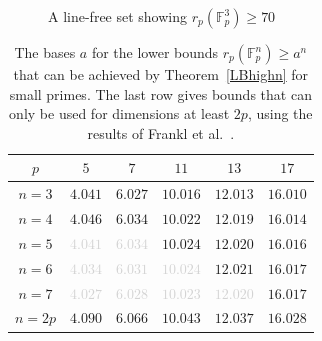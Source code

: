 \documentclass[12pt]{amsart}
\newcommand{\<}{\langle}
\renewcommand{\>}{\rangle}
\numberwithin{equation}{section}
\numberwithin{theorem}{section}
\begin{document}
\begin{figure}[H]
\caption{A line-free set showing $r_p(\mathbb{F}_p^3)\geq 70$}
\label{fig70}
\end{figure}

\begin{table}[h!]
\centering
\begin{tabular}{ |c|c|c|c|c|c| } 
\hline
$p$ & $5$ & $7$ & $11$ & $13$ & $17$ \\
\hline
$n=3$ & $4.041$ & $6.027$ & $10.016$ & $12.013$ & $16.010$ \\ 
$n=4$ & $4.046$ & $6.034$ & $10.022$ & $12.019$ & $16.014$ \\ 
$n=5$ & \textcolor{lightgray}{$4.041$} & \textcolor{lightgray}{$6.034$}  & $10.024$ & $12.020$ & $16.016$ \\ 
$n=6$ & \textcolor{lightgray}{$4.034$}  & \textcolor{lightgray}{$6.031$}  & \textcolor{lightgray}{$10.024$}   & $12.021$ & $16.017$ \\ 
$n=7$ & \textcolor{lightgray}{$4.027$}  & \textcolor{lightgray}{$6.028$}  & \textcolor{lightgray}{$10.023$}  & \textcolor{lightgray}{$12.020$}  & $16.017$ \\ 
\hline
$n=2p$ & $4.090$ & $6.066$ & $10.043$ & $12.037$ & $16.028$ \\ 
\hline

\end{tabular}
\caption{The bases $a$ for the lower bounds $r_p(\mathbb{F}_p^n)\geq a^n$ that can be achieved by Theorem~\ref{LBhighn} for small primes. The last row gives bounds that can only be used for dimensions at least $2p$, using the results of Frankl et al.~\cite{FGR}.}
\label{table:1}
\end{table}
\end{document}
